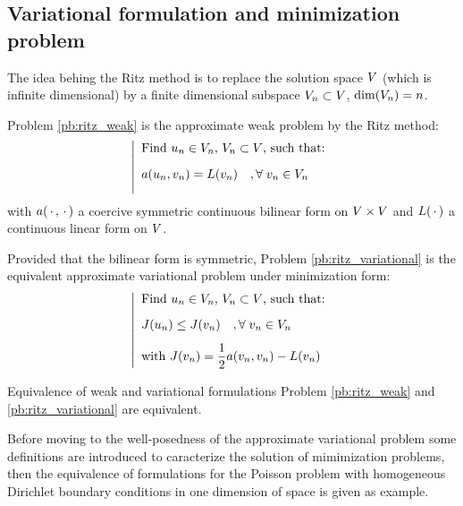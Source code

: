 \subsection{Variational formulation and minimization problem}

The idea behing the Ritz method is to replace the solution space ${V}$ (which is infinite dimensional) by a finite dimensional subspace ${V}_n \subset {V}$, $\dim({V}_n) = n$.

\medskip
Problem \eqref{pb:ritz_weak} is the approximate weak problem by the Ritz method:
\begin{equation}\label{pb:ritz_weak}
\left\lvert
\begin{array}{ll}
\mbox{Find $u_n \in {V}_n$, ${V}_n \subset {V}$, such that:}\\[2ex]
a( u_n, v_n ) = L(v_n)\quad,{\forall\;}  v_n \in {V}_n\\[2ex]
\end{array}
\right .
\end{equation}
with $a(\,{\mathbf\cdot}\,,\,{\mathbf\cdot}\,)$ a coercive symmetric continuous bilinear form on ${V}\times{V}$ and $L(\,{\mathbf\cdot}\,)$ a continuous linear form on ${V}$.

\medskip
Provided that the bilinear form is symmetric, Problem \eqref{pb:ritz_variational} is the equivalent approximate variational problem under minimization form:
\begin{equation}\label{pb:ritz_variational}
\left\lvert
\begin{array}{ll}
\mbox{Find $u_n \in {V}_n$, ${V}_n \subset {V}$, such that:}\\[2ex]
J(u_n) \leq J(v_n)\quad,{\forall\;}  v_n \in {V}_n\\[2ex]
\mbox{with $J(v_n) = \displaystyle\frac{1}{2} a(v_n,v_n) - L(v_n)$}
\end{array}
\right .
\end{equation}

\begin{prpstn}{Equivalence of weak and variational formulations}
Problem \ref{pb:ritz_weak} and \ref{pb:ritz_variational} are equivalent.
\end{prpstn}

\medskip
Before moving to the well-posedness of the approximate variational problem some definitions are introduced to caracterize the solution of mimimization problems, then the equivalence of formulations for the Poisson problem with homogeneous Dirichlet boundary conditions in one dimension of space is given as example.



